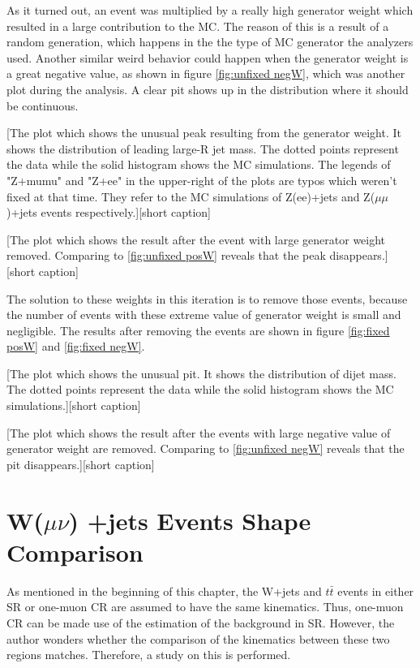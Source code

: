\documentclass[class=NCU_thesis, crop=false]{standalone}
\begin{document}
		As it turned out, an event was multiplied by a really high generator weight which resulted in a large contribution to the MC. The reason of this is a result of a random generation, which happens in the the type of MC generator the analyzers used. Another similar weird behavior could happen when the generator weight is a great negative value, as shown in figure \ref{fig:unfixed negW}, which was another plot during the analysis. A clear pit shows up in the distribution where it should be continuous.
		
		[The plot which shows the unusual peak resulting from the generator weight. It shows the distribution of leading large-R jet mass. The dotted points represent the data while the solid histogram shows the MC simulations. The legends of "Z+mumu" and "Z+ee" in the upper-right of the plots are typos which weren't fixed at that time. They refer to the MC simulations of Z(ee)+jets and Z($\mu \mu$)+jets events respectively.][short caption]
		
		[The plot which shows the result after the event with large generator weight removed. Comparing to \ref{fig:unfixed posW} reveals that the peak disappears.][short caption]
		
		The solution to these weights in this iteration is to remove those events, because the number of events with these extreme value of generator weight is small and negligible. The results after removing the events are shown in figure \ref{fig:fixed posW} and \ref{fig:fixed negW}.
		
		[The plot which shows the unusual pit. It shows the distribution of dijet mass. The dotted points represent the data while the solid histogram shows the MC simulations.][short caption]
		
		[The plot which shows the result after the events with large negative value of generator weight are removed. Comparing to \ref{fig:unfixed negW} reveals that the pit disappears.][short caption]
	
	\section{W($\mu \nu$) +jets Events Shape Comparison}
		As mentioned in the beginning of this chapter, the W+jets and $t\bar{t}$ events in either SR or one-muon CR are assumed to have the same kinematics. Thus, one-muon CR can be made use of the estimation of the background in SR. However, the author wonders whether the comparison of the kinematics between these two regions matches. Therefore, a study on this is performed.
	
\end{document}
